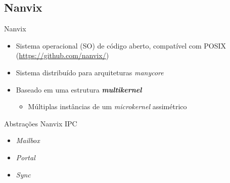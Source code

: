 \documentclass{beamer}
\begin{document}
  \subsection{Nanvix}
    \begin{frame}{Nanvix}
      \begin{itemize}
        \item Sistema operacional (SO) de código aberto, compatível com POSIX (\url{https://github.com/nanvix/})
        \item Sistema distribuído para arquiteturas \textit{manycore}
        \item Baseado em uma estrutura \textbf{\textit{multikernel}}
        \begin{itemize}
          \item Múltiplas instâncias de um \textit{microkernel} assimétrico
        \end{itemize}
      \end{itemize}

      \begin{figure}
        \centering
        \hspace{0.05\linewidth}
      \end{figure}
    \end{frame}

    \begin{frame}{Abstrações Nanvix IPC}
      \begin{itemize}
        \item \textit{Mailbox}
        \item \textit{Portal}
        \item \textit{Sync}
      \end{itemize}
    \end{frame}
\end{document}
